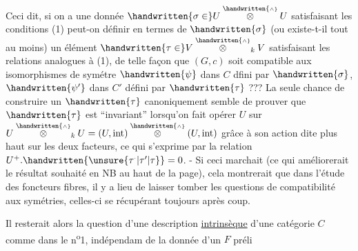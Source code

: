 Ceci dit, si on a une donnée $\handwritten{\sigma\in}U\overset{\handwritten{\scriptscriptstyle\wedge}}{\otimes} U$ satisfaisant les conditions (1) peut-on définir en termes de $\handwritten{\sigma}$ (ou existe-t-il tout au moins) un élément $\handwritten{\tau\in}V\overset{\handwritten{\scriptscriptstyle\wedge}}{\otimes}_k V$ satisfaisant les relations analogues à (1), de telle façon que $(G,c)$ soit compatible aux isomorphismes de symétre $\handwritten{\psi}$ dans $C$ dfini par $\handwritten{\sigma}$, $\handwritten{\psi'}$ dans $C'$ défini par $\handwritten{\tau}$ ??? La seule chance de  construire un $\handwritten{\tau}$ canoniquement semble de prouver que $\handwritten{\tau}$ est ``invariant'' lorsqu'on fait opérer $U$ sur $U\overset{\handwritten{\scriptscriptstyle\wedge}}{\otimes}_k U=(U,\mathrm{int})\overset{\handwritten{\scriptscriptstyle\wedge}}{\otimes}(U,\mathrm{int})$ grâce à son action dite plus haut sur les deux facteurs, ce qui s'exprime par la relation $U^+ .\handwritten{\unsure{\tau^{\scriptscriptstyle\cdot}|\tau'|\tau}}=0$. - Si ceci marchait (ce qui améliorerait le résultat souhaité en NB au haut de la page), cela montrerait que dans l'étude des foncteurs fibres, il y a lieu de laisser tomber les questions de compatibilité aux symétries, celles-ci se récupérant toujours après coup.

Il resterait alors la question d'une description \uline{intrinsèque} d'une catégorie $C$ comme dans le n\textsuperscript{o}1, indépendam de la donnée d'un $F$ préli%
